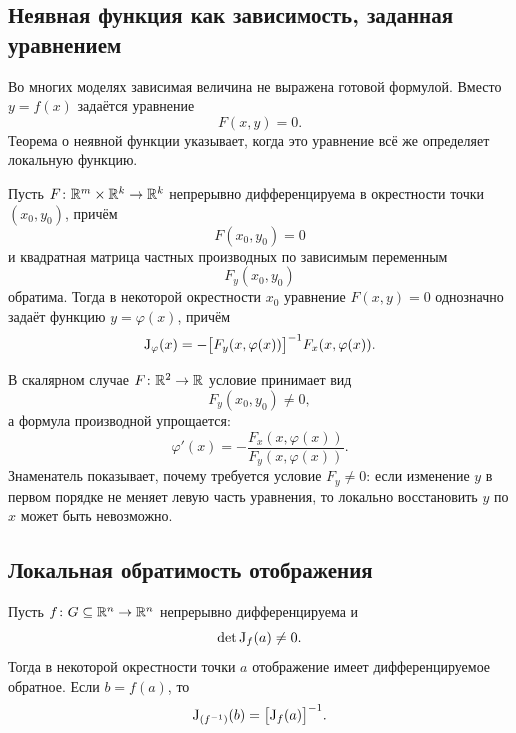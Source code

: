 \subsection{Неявная функция как зависимость, заданная уравнением}

Во многих моделях зависимая величина не выражена готовой формулой. Вместо \(y=f(x)\) задаётся уравнение
\[
F(x,y)=0.
\]
Теорема о неявной функции указывает, когда это уравнение всё же определяет локальную функцию.

\begin{theorem}
Пусть \(F\colon\mathbb{R}^m\times\mathbb{R}^k\to\mathbb{R}^k\) непрерывно дифференцируема в окрестности точки \((x_0,y_0)\), причём
\[
F(x_0,y_0)=0
\]
и квадратная матрица частных производных по зависимым переменным
\[
F_y(x_0,y_0)
\]
обратима. Тогда в некоторой окрестности \(x_0\) уравнение \(F(x,y)=0\) однозначно задаёт функцию \(y=\varphi(x)\), причём
\begin{equation}
\mathrm{J}_{\varphi}(x)
=
-\bigl[F_y(x,\varphi(x))\bigr]^{-1}F_x(x,\varphi(x)).
\label{eq:implicit-derivative}
\end{equation}
\end{theorem}

В скалярном случае \(F\colon\mathbb{R}^2\to\mathbb{R}\) условие принимает вид
\[
F_y(x_0,y_0)\neq0,
\]
а формула производной упрощается:
\begin{equation}
\varphi'(x)
=-\frac{F_x(x,\varphi(x))}{F_y(x,\varphi(x))}.
\label{eq:implicit-scalar-derivative}
\end{equation}
Знаменатель показывает, почему требуется условие \(F_y\neq0\): если изменение \(y\) в первом порядке не меняет левую часть уравнения, то локально восстановить \(y\) по \(x\) может быть невозможно.

\subsection{Локальная обратимость отображения}

\begin{theorem}
Пусть \(f\colon G\subseteq\mathbb{R}^n\to\mathbb{R}^n\) непрерывно дифференцируема и
\[
\det\mathrm{J}_{f}(a)\neq0.
\]
Тогда в некоторой окрестности точки \(a\) отображение имеет дифференцируемое обратное. Если \(b=f(a)\), то
\begin{equation}
\mathrm{J}_{(f^{-1})}(b)
=
\bigl[\mathrm{J}_{f}(a)\bigr]^{-1}.
\label{eq:inverse-function-derivative}
\end{equation}
\end{theorem}

